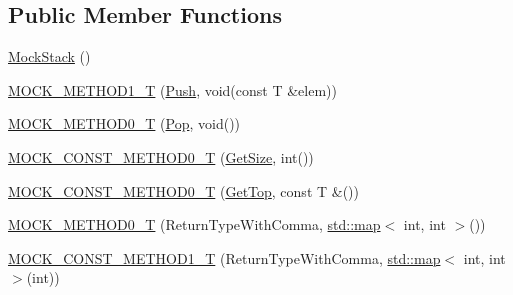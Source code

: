 \subsection*{Public Member Functions}
\begin{DoxyCompactItemize}
\item 
\hyperlink{classtesting_1_1gmock__generated__function__mockers__test_1_1MockStack_aa8a3df8e1cbc95836663acd99c3e9d37}{Mock\+Stack} ()
\item 
\hyperlink{classtesting_1_1gmock__generated__function__mockers__test_1_1MockStack_a0ad833bc6134c5150b8271a5ba2e91b5}{M\+O\+C\+K\+\_\+\+M\+E\+T\+H\+O\+D1\+\_\+T} (\hyperlink{classtesting_1_1gmock__generated__function__mockers__test_1_1StackInterface_a49448f6195021fee947d37b80b6e5d30}{Push}, void(const T \&elem))
\item 
\hyperlink{classtesting_1_1gmock__generated__function__mockers__test_1_1MockStack_a5e55ffb22e7f11c6940a97bd001bd50c}{M\+O\+C\+K\+\_\+\+M\+E\+T\+H\+O\+D0\+\_\+T} (\hyperlink{classtesting_1_1gmock__generated__function__mockers__test_1_1StackInterface_a1a6646d1d9febe90c607b9b3e4539b67}{Pop}, void())
\item 
\hyperlink{classtesting_1_1gmock__generated__function__mockers__test_1_1MockStack_a6171be20e8e4f44464cc8968e05b7c7a}{M\+O\+C\+K\+\_\+\+C\+O\+N\+S\+T\+\_\+\+M\+E\+T\+H\+O\+D0\+\_\+T} (\hyperlink{classtesting_1_1gmock__generated__function__mockers__test_1_1StackInterface_a537ec8647a2333f50e5f923a85b90eba}{Get\+Size}, int())
\item 
\hyperlink{classtesting_1_1gmock__generated__function__mockers__test_1_1MockStack_ae5950cfac08382a0ffc7c3bd5aba405f}{M\+O\+C\+K\+\_\+\+C\+O\+N\+S\+T\+\_\+\+M\+E\+T\+H\+O\+D0\+\_\+T} (\hyperlink{classtesting_1_1gmock__generated__function__mockers__test_1_1StackInterface_af36e32b9ae568100363466d1ebf95364}{Get\+Top}, const T \&())
\item 
\hyperlink{classtesting_1_1gmock__generated__function__mockers__test_1_1MockStack_a4b67d1f5b795e7c072fb846217a8f130}{M\+O\+C\+K\+\_\+\+M\+E\+T\+H\+O\+D0\+\_\+T} (Return\+Type\+With\+Comma, \hyperlink{app_2main_8cpp_a8f2b5a2f358cff079fbf01614064fbe5}{std\+::map}$<$ int, int $>$())
\item 
\hyperlink{classtesting_1_1gmock__generated__function__mockers__test_1_1MockStack_a69b9a7d0231b729d8a47201a49fa9166}{M\+O\+C\+K\+\_\+\+C\+O\+N\+S\+T\+\_\+\+M\+E\+T\+H\+O\+D1\+\_\+T} (Return\+Type\+With\+Comma, \hyperlink{app_2main_8cpp_a8f2b5a2f358cff079fbf01614064fbe5}{std\+::map}$<$ int, int $>$(int))
\end{DoxyCompactItemize}


